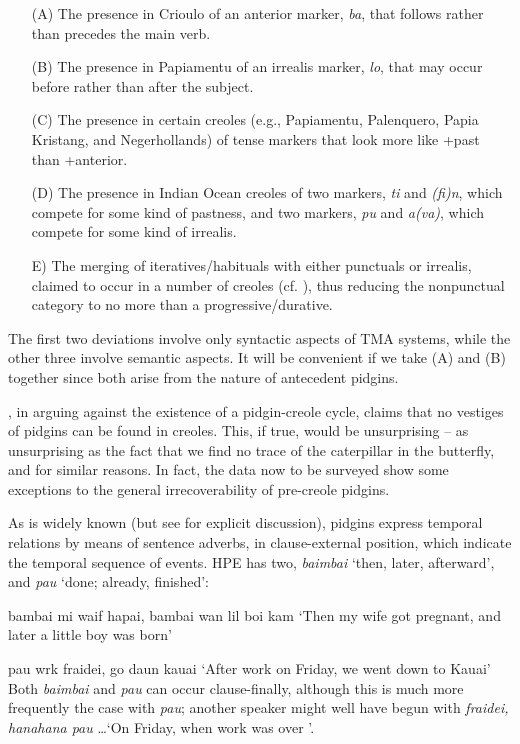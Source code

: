 \begin{itemize}\label{majordeviations}
\item[(A)] The presence in Crioulo of an anterior marker, \textit{ba}, that follows rather than precedes the main verb.
\item[(B)] The presence in Papiamentu of an irrealis marker, \textit{lo}, that may occur before rather than after the subject.
\item[(C)] The presence in certain creoles (e.g., Papiamentu, Palenquero, Papia Kristang, and Negerhollands) of tense markers that look more like +past than +anterior.
\item[(D)] The presence in Indian Ocean creoles of two markers, \textit{ti} and \textit{(fi)n}, which compete for some kind of pastness, and two markers, \textit{pu} and \textit{a(va)}, which compete for some kind of irrealis.
\item[E)] The merging of iteratives/habituals with either punctuals or irrealis, claimed to occur in a number of creoles (cf. \citealt{Taylor1971}), thus reducing the nonpunctual category to no more than a progressive/durative.
\end{itemize}

The first two deviations involve only syntactic aspects of TMA systems, while the other three involve semantic aspects. It will be convenient if we take (A) and (B) together since both arise from the nature of antecedent pidgins.

\citet{Alleyne1979}, in arguing against the existence of a pidgin-creole cycle, claims that no vestiges of pidgins can be found in creoles. This, if true, would be unsurprising -- as unsurprising as the fact that we find no trace of the caterpillar in the butterfly, and for similar reasons. In fact, the data now to be surveyed show some exceptions to the general irrecoverability of pre-creole pidgins.

As is widely known (but see \citet{Labov1971} for explicit discussion), pidgins express temporal relations by means of sentence adverbs, in clause-external position, which indicate the temporal sequence of events. HPE has two, \textit{baimbai} `then, later, afterward', and \textit{pau} `done; already, finished':

\ea\label{ex:2:92}
 {bambai} {mi} {waif} {hapai,} {bambai} {wan} {lil} {boi} {kam}
\glt `Then my wife got pregnant, and later a little boy was born'
\z

\ea\label{ex:2:93}
pau wrk fraidei, go daun kauai
\glt `After work on Friday, we went down to Kauai'
\z
Both \textit{baimbai }and \textit{pau }can occur clause-finally, although this is much more frequently the case with \textit{pau}; another speaker might well have begun  with \textit{fraidei, hanahana pau} \ldots\xspace `On Friday, when work was over \textellipsis'.

